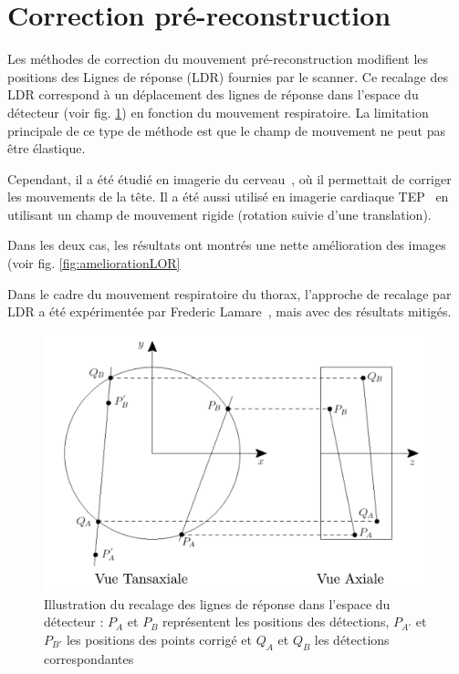 \section{Correction pré-reconstruction}


Les méthodes de correction du mouvement pré-reconstruction modifient les positions des Lignes de réponse (LDR) fournies par le scanner.
Ce recalage des LDR correspond à un déplacement des lignes de réponse dans l'espace du détecteur (voir fig. \ref{fig:recalageLOR}) en fonction du mouvement respiratoire. La limitation principale de ce type de méthode est que le champ de mouvement ne peut pas être élastique.

Cependant, il a été étudié en imagerie du cerveau~\cite{bloomfield2003design}, où il permettait de corriger les mouvements de la tête. Il a été aussi utilisé en imagerie cardiaque TEP~\cite{livieratos2005rigid} en utilisant un champ de mouvement rigide (rotation suivie d'une translation).

Dans les deux cas, les résultats ont montrés une nette amélioration des images (voir fig. \ref{fig:ameliorationLOR}

Dans le cadre du mouvement respiratoire du thorax, l'approche de recalage par LDR a été expérimentée par Frederic Lamare~\cite{lamare2007respiratory}, mais avec des résultats mitigés.

\begin{figure}[h!]
	\begin{center}
		\includegraphics[width=12cm]{images/recalageLOR}
	\end{center}
	\caption{Illustration du recalage des lignes de réponse dans l'espace du détecteur : $P_A$ et $P_B$ représentent les positions des détections, $P_{A'}$ et $P_{B'}$ les positions des points corrigé et $Q_A$ et $Q_B$ les détections correspondantes } 
	\label{fig:recalageLOR}
\end{figure}

